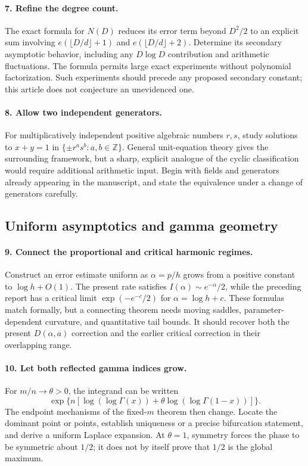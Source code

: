 \paragraph{7. Refine the degree count.}
The exact formula for $N(D)$ reduces its error term beyond $D^2/2$ to
an explicit sum involving $e(\lfloor D/d\rfloor+1)$ and
$e(\lfloor D/d\rfloor+2)$. Determine its secondary asymptotic behavior,
including any $D\log D$ contribution and arithmetic fluctuations.
The formula permits large exact experiments without polynomial
factorization. Such experiments should precede any proposed secondary
constant; this article does not conjecture an unevidenced one.

\paragraph{8. Allow two independent generators.}
For multiplicatively independent positive algebraic numbers $r,s$,
study solutions to $x+y=1$ in
$\{\pm r^as^b:a,b\in\mathbb Z\}$. General unit-equation theory gives
the surrounding framework, but a sharp, explicit analogue of the
cyclic classification would require additional arithmetic input.
Begin with fields and generators already appearing in the manuscript,
and state the equivalence under a change of generators carefully.

\subsection{Uniform asymptotics and gamma geometry}

\paragraph{9. Connect the proportional and critical harmonic regimes.}
Construct an error estimate uniform as $\alpha=p/h$ grows from a
positive constant to $\log h+O(1)$. The present rate satisfies
$I(\alpha)\sim e^{-\alpha}/2$, while the preceding report has a
critical limit $\exp(-e^{-c}/2)$ for $\alpha=\log h+c$.
These formulas match formally, but a connecting theorem needs moving
saddles, parameter-dependent curvature, and quantitative tail bounds.
It should recover both the present $D(\alpha,a)$ correction and the
earlier critical correction in their overlapping range.

\paragraph{10. Let both reflected gamma indices grow.}
For $m/n\to\theta>0$, the integrand can be written
\[
 \exp\{n[\log(\log\Gamma(x))
              +\theta\log(\log\Gamma(1-x))]\}.
\]
The endpoint mechanisms of the fixed-$m$ theorem then change.
Locate the dominant point or points, establish uniqueness or a precise
bifurcation statement, and derive a uniform Laplace expansion. At
$\theta=1$, symmetry forces the phase to be symmetric about $1/2$;
it does not by itself prove that $1/2$ is the global maximum.

